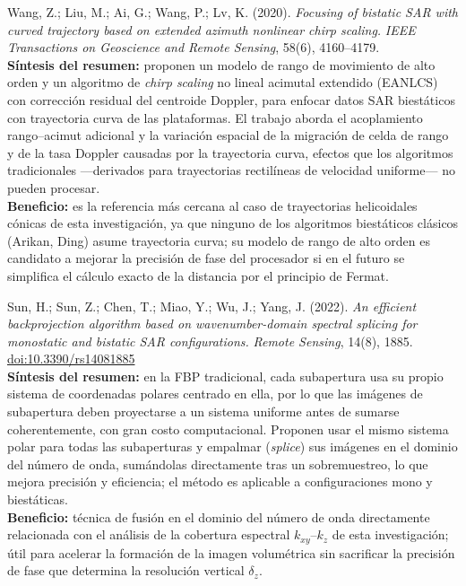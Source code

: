 \documentclass[11pt,a4paper]{report}
\begin{document}
\begin{enumerate}[label=\textbf{[B\arabic*]}, leftmargin=2.2cm, itemsep=10pt]
\item Wang, Z.; Liu, M.; Ai, G.; Wang, P.; Lv, K. (2020). \textit{Focusing of
bistatic SAR with curved trajectory based on extended azimuth nonlinear
chirp scaling.} \emph{IEEE Transactions on Geoscience and Remote Sensing},
58(6), 4160--4179. \cite{wang2020}\\
\textbf{Síntesis del resumen:} proponen un modelo de rango de movimiento de
alto orden y un algoritmo de \emph{chirp scaling} no lineal acimutal
extendido (EANLCS) con corrección residual del centroide Doppler, para
enfocar datos SAR biestáticos con trayectoria curva de las plataformas. El
trabajo aborda el acoplamiento rango--acimut adicional y la variación
espacial de la migración de celda de rango y de la tasa Doppler causadas por
la trayectoria curva, efectos que los algoritmos tradicionales ---derivados
para trayectorias rectilíneas de velocidad uniforme--- no pueden procesar.\\
\textbf{Beneficio:} es la referencia más cercana al caso de trayectorias
helicoidales cónicas de esta investigación, ya que ninguno de los algoritmos
biestáticos clásicos (Arikan, Ding) asume trayectoria curva; su modelo de
rango de alto orden es candidato a mejorar la precisión de fase del
procesador si en el futuro se simplifica el cálculo exacto de la distancia
por el principio de Fermat.

\item Sun, H.; Sun, Z.; Chen, T.; Miao, Y.; Wu, J.; Yang, J. (2022).
\textit{An efficient backprojection algorithm based on wavenumber-domain
spectral splicing for monostatic and bistatic SAR configurations.}
\emph{Remote Sensing}, 14(8), 1885.
\href{https://doi.org/10.3390/rs14081885}{doi:10.3390/rs14081885}
\cite{sun2022}\\
\textbf{Síntesis del resumen:} en la FBP tradicional, cada subapertura usa
su propio sistema de coordenadas polares centrado en ella, por lo que las
imágenes de subapertura deben proyectarse a un sistema uniforme antes de
sumarse coherentemente, con gran costo computacional. Proponen usar el
mismo sistema polar para todas las subaperturas y empalmar (\emph{splice})
sus imágenes en el dominio del número de onda, sumándolas directamente tras
un sobremuestreo, lo que mejora precisión y eficiencia; el método es
aplicable a configuraciones mono y biestáticas.\\
\textbf{Beneficio:} técnica de fusión en el dominio del número de onda
directamente relacionada con el análisis de la cobertura espectral
$k_{xy}$--$k_z$ de esta investigación; útil para acelerar la formación de la
imagen volumétrica sin sacrificar la precisión de fase que determina la
resolución vertical $\delta_z$.


\end{enumerate}
\end{document}
